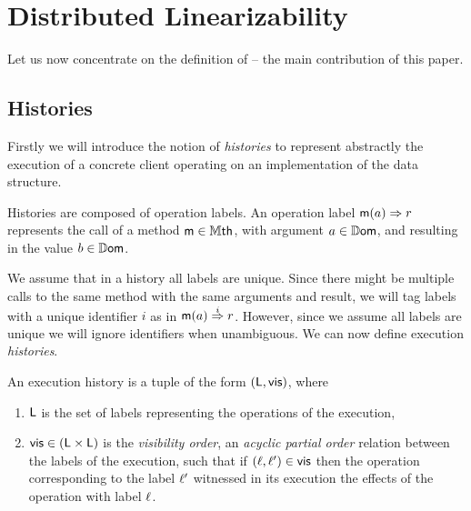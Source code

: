 
\section{Distributed Linearizability}
\label{sec:distributed-lin}

Let us now concentrate on the definition of \crdtlin{} -- the main
contribution of this paper.
%

\subsection{Histories}
\label{subsec:histories}

Firstly we will introduce the notion of \emph{histories} to represent
abstractly the execution of a concrete client operating on an
implementation of the data structure.

Histories are composed of operation labels.
An operation label $\mathsf{m}(a) \Rightarrow r$ represents the call of a method
$\mathsf{m} \in \mathbb{M}\mathsf{th}$, with argument $a \in \mathbb{D}\mathsf{om}$, and
resulting in the value $b \in \mathbb{D}\mathsf{om}$.

We assume that in a history all labels are unique.
Since there might be multiple calls to the same method with the same
arguments and result, we will tag labels with a unique identifier $i$
as in $\mathsf{m}(a) \overset{i}{\Rightarrow} r$.
However, since we assume all labels are unique we will ignore
identifiers when unambiguous.
We can now define execution \emph{histories}.



\begin{definition}[histories]
  \label{definition:histories} An execution history is a tuple of the form
  $(\mathsf{L}, \mathsf{vis})$, where
  \begin{enumerate}
  \item $\mathsf{L}$ is the set of labels representing the operations of
    the execution,
  \item $\mathsf{vis} \in (\mathsf{L} \times \mathsf{L})$ is the
    \emph{visibility order}, an \emph{acyclic partial order}
    relation between the labels of the execution, such that if $(\ell,
    \ell') \in \mathsf{vis}$ then the operation corresponding to the label
    $\ell'$ witnessed in its execution the effects of the operation
    with label $\ell$.
  \end{enumerate}
\end{definition}

